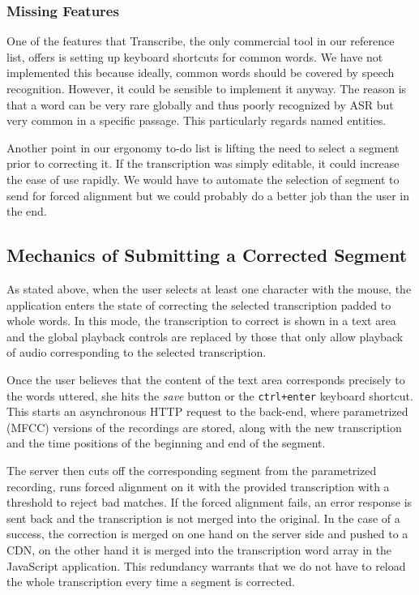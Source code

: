 \documentclass{svproc}
\begin{document}
\subsubsection{Missing Features}

One of the features that Transcribe, the only commercial tool in our reference
list, offers is setting up keyboard shortcuts for common words. We have not
implemented this because ideally, common words should be covered by speech
recognition. However, it could be sensible to implement it anyway. The reason is
that a word can be very rare globally and thus poorly recognized by ASR but very
common in a specific passage. This particularly regards named entities.

Another point in our ergonomy to-do list is lifting the need to select a segment
prior to correcting it. If the transcription was simply editable, it could
increase the ease of use rapidly. We would have to automate the selection of
segment to send for forced alignment but we could probably do a better job than
the user in the end.

\subsection{Mechanics of Submitting a Corrected Segment}

As stated above, when the user selects at least one character with the mouse,
the application enters the state of correcting the selected transcription padded
to whole words. In this mode, the transcription to correct is shown in a
text area and the global playback controls are replaced by those that only allow
playback of audio corresponding to the selected transcription.

Once the user believes that the content of the text area corresponds precisely
to the words uttered, she hits the {\em save} button or the \texttt{ctrl+enter}
keyboard shortcut. This starts an asynchronous HTTP request to the back-end,
where parametrized (MFCC) versions of the recordings are stored, along with the
new transcription and the time positions of the beginning and end of the
segment.

The server then cuts off the corresponding segment from the parametrized
recording, runs forced alignment on it with the provided transcription with a
threshold to reject bad matches. If the forced alignment fails, an error
response is sent back and the transcription is not merged into the original. In
the case of a success, the correction is merged on one hand on the server side
and pushed to a CDN, on the other hand it is merged into the transcription word
array in the JavaScript application. This redundancy warrants that we do not
have to reload the whole transcription every time a segment is corrected.
\end{document}
